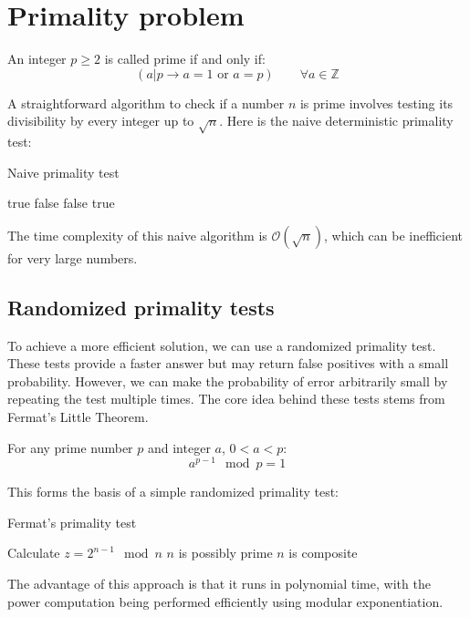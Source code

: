 \section{Primality problem}

\begin{definition}
    An integer $p\geq 2$ is called prime if and only if: 
    \[(a|p\rightarrow a=1\text{ or }a=p) \qquad \forall a\in\mathbb{Z} \]
\end{definition}

A straightforward algorithm to check if a number $n$ is prime involves testing its divisibility by every integer up to $\sqrt{n}$.
Here is the naive deterministic primality test:
\begin{algorithm}[H]
    \caption{Naive primality test}
    \begin{algorithmic}[1]
            \State \Return true 
        \EndIf 
            \State \Return false 
        \EndIf 
                \State \Return false 
            \EndIf 
        \EndFor 
        \State \Return true 
    \end{algorithmic}
\end{algorithm} 
The time complexity of this naive algorithm is $\mathcal{O}(\sqrt{n})$, which can be inefficient for very large numbers.














\subsection{Randomized primality tests}
To achieve a more efficient solution, we can use a randomized primality test.
These tests provide a faster answer but may return false positives with a small probability.
However, we can make the probability of error arbitrarily small by repeating the test multiple times.
The core idea behind these tests stems from Fermat's Little Theorem. 
\begin{theorem}[Fermat]
    For any prime number $p$ and integer $a$, $0<a<p$: 
    \[a^{p-1}\mod p= 1\]
\end{theorem}
This forms the basis of a simple randomized primality test:
\begin{algorithm}[H]
    \caption{Fermat's primality test}
    \begin{algorithmic}[1]
        \State Calculate $z=2^{n-1}\mod n$
            \State $n$ is possibly prime 
        \Else 
            \State $n$ is composite
        \EndIf
    \end{algorithmic}
\end{algorithm} 
The advantage of this approach is that it runs in polynomial time, with the power computation being performed efficiently using modular exponentiation.


